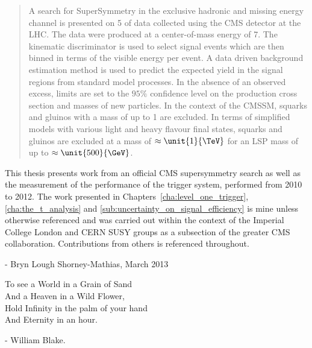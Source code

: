 \begin{abstract}
A search for SuperSymmetry in the exclusive hadronic and missing energy channel 
is presented on \unit{5}{\invfb} of data collected using the CMS detector at 
the LHC. The data were produced at a center-of-mass energy of \unit{7}{\TeV}. 
The kinematic discriminator \alt is used to select signal events which are then 
binned in terms of the visible energy per event. A data driven background 
estimation method is used to predict the expected yield in the signal regions 
from standard model processes. In the absence of an observed excess, limits are 
set to the $95\%$ confidence level on the production cross section and masses 
of new particles. In the context of the CMSSM, squarks and gluinos with a mass 
of up to \unit{1}{\TeV} are excluded. In terms of simplified models with 
various light and heavy flavour final states, squarks and gluinos are excluded 
at a mass of $\approx\unit{1}{\TeV}$ for an LSP mass of up to 
$\approx\unit{500}{\GeV}$.


\end{abstract}


\begin{declaration}
This thesis presents work from an official CMS supersymmetry search as well as 
the measurement of the performance of the \Lone trigger system, performed from 
2010 to 2012. The work presented in Chapters~\ref{cha:level_one_trigger}, 
\ref{cha:the_t_analysis} and \ref{sub:uncertainty_on_signal_efficiency} is mine 
unless otherwise referenced and was carried out within the context of the 
Imperial College London and CERN SUSY groups as a subsection of the greater CMS 
collaboration. Contributions from others is referenced throughout.

\vspace*{1cm}

\begin{flushright}
- Bryn Lough Shorney-Mathias, March 2013
\end{flushright}

\end{declaration}


\begin{preface}
\begin{centering}To see a World in a Grain of Sand\\
And a Heaven in a Wild Flower,\\
Hold Infinity in the palm of your hand \\
And Eternity in an hour.\\
\end{centering}

\begin{flushright}
- William Blake.
\end{flushright}
\end{preface}

